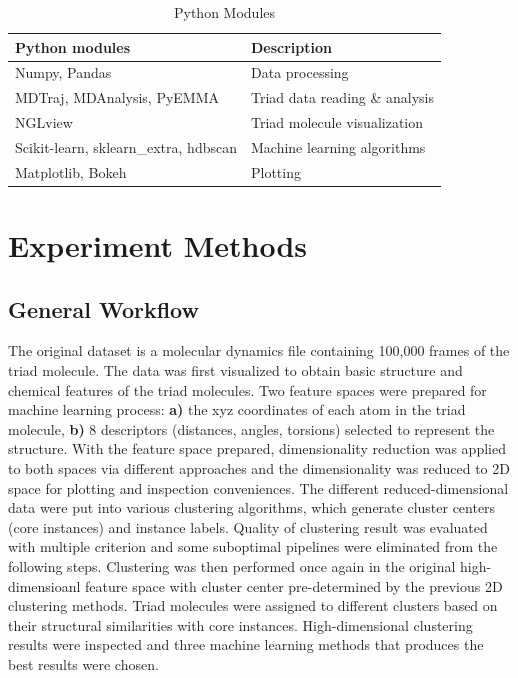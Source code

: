 \documentclass[a4paper]{article}
\begin{document}
\begin{table}[H]
    \centering
    \caption{Python Modules}
    \begin{tabular}{l|l}
    \hline \hline
        \textbf{Python modules} & \textbf{Description} \\
        \hline
        Numpy, Pandas & Data processing \\
        MDTraj\cite{MDTraj}, MDAnalysis\cite{MDAnalysis_1}\cite{MDAnalysis_2}, PyEMMA \cite{pyemma}     & Triad data reading \& analysis \\
        NGLview\cite{NGLview} & Triad molecule visualization \\
        Scikit-learn\cite{scikit-learn}, sklearn\_extra, hdbscan\cite{hdbscan} & Machine learning algorithms \\
        Matplotlib, Bokeh & Plotting \\
        \hline \hline
    \end{tabular}
    \label{table: python modules}
\end{table}

\section{Experiment Methods}

\subsection{General Workflow}
The original dataset is a molecular dynamics file containing 100,000 frames of the triad molecule. The data was first visualized to obtain basic structure and chemical features of the triad molecules. Two feature spaces were prepared for machine learning process: \textbf{a)} the xyz coordinates of each atom in the triad molecule, \textbf{b)} 8 descriptors (distances, angles, torsions) selected to represent the structure. With the feature space prepared, dimensionality reduction was applied to both spaces via different approaches and the dimensionality was reduced to 2D space for plotting and inspection conveniences. The different reduced-dimensional data were put into various clustering algorithms, which generate cluster centers (core instances) and instance labels. Quality of clustering result was evaluated with multiple criterion and some suboptimal pipelines were eliminated from the following steps. Clustering was then performed once again in the original high-dimensioanl feature space with cluster center pre-determined by the previous 2D clustering methods. Triad molecules were assigned to different clusters based on their structural similarities with core instances. High-dimensional clustering results were inspected and three machine learning methods that produces the best results were chosen.
\end{document}
